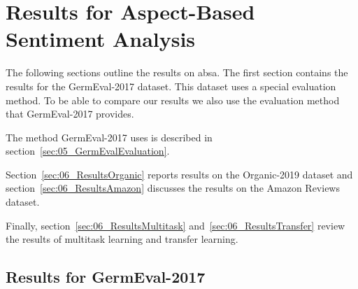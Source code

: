 \section{Results for Aspect-Based Sentiment Analysis}
The following sections outline the results on \acrfull{absa}. The first section contains the results for the GermEval-2017 dataset. This dataset uses a special evaluation method. To be able to compare our results we also use the evaluation method that GermEval-2017 provides.

The method GermEval-2017 uses is described in section~\ref{sec:05_GermEvalEvaluation}.
\medskip

Section~\ref{sec:06_ResultsOrganic} reports results on the Organic-2019 dataset and section~\ref{sec:06_ResultsAmazon} discusses the results on the Amazon Reviews dataset.

Finally, section~\ref{sec:06_ResultsMultitask} and~\ref{sec:06_ResultsTransfer} review the results of multitask learning and transfer learning.

\subsection{Results for GermEval-2017}
\label{sec:06_ResultsGermEval}

